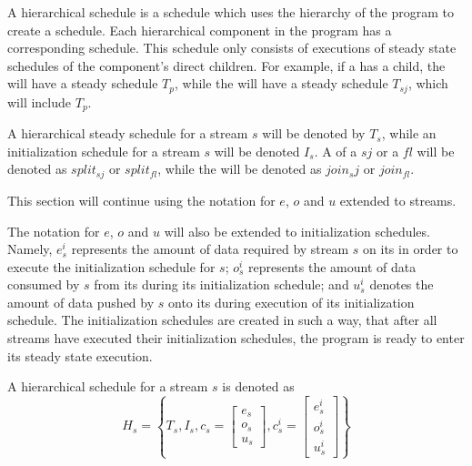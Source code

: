 A hierarchical schedule is a schedule which uses the hierarchy of
the program to create a schedule. Each hierarchical component in
the program has a corresponding schedule. This schedule only
consists of executions of steady state schedules of the
component's direct children. For example, if a {\splitjoin} has a
{\pipeline} child, the {\pipeline} will have a steady schedule $T_p$,
while the {\splitjoin} will have a steady schedule $T_{sj}$, which
will include $T_p$.

A hierarchical steady schedule for a stream $s$ will be denoted by
$T_s$, while an initialization schedule for a stream $s$ will be
denoted $I_s$. A {\splitter} of a {\splitjoin} $sj$ or a
{{\feedbackloop}} $fl$ will be denoted as $split_{sj}$ or
$split_{fl}$, while the {\joiner} will be denoted as $join_sj$ or
$join_{fl}$.

This section will continue using the notation for $e$, $o$ and $u$
extended to streams.
\begin{comment}
That is, for a stream $s$,
$e_s$ will represent the amount of data needed by $s$ on its
{\Input} {{\Channel}} in order to execute its minimal steady state
schedule; $o_s$ represents the amount of data consumed by from its
{\Input} {{\Channel}} $s$ during execution of its steady state
schedule; and $u_s$ represents the amount of data pushed by $s$
onto its {\Output} {{\Channel}}.
\end{comment}
The notation for $e$, $o$ and $u$ will also be extended to
initialization schedules.  Namely, $e^i_s$ represents the amount
of data required by stream $s$ on its {\Input} {{\Channel}} in
order to execute the initialization schedule for $s$; $o^i_s$
represents the amount of data consumed by $s$ from its {\Input}
{{\Channel}} during its initialization schedule; and $u^i_s$
denotes the amount of data pushed by $s$ onto its {\Output}
{{\Channel}} during execution of its initialization schedule.  The
initialization schedules are created in such a way, that after all
streams have executed their initialization schedules, the program
is ready to enter its steady state execution.

\begin{comment}
Note, that it is possible that a stream $s$ has $u^i_s \ne
0$. An example of this will be presented in Section
\ref{sec:sas-fl}.
\end{comment}

A hierarchical schedule for a stream $s$ is denoted as $$H_s =
\left\{T_s, I_s, c_s = \left[\begin{array}{c}
e_s\\o_s\\u_s\end{array}\right], c^i_s =
\left[\begin{array}{c}e^i_s\\o^i_s\\u^i_s\end{array}\right]\right\}$$

